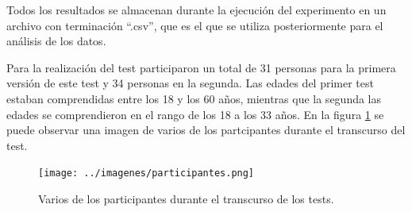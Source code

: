 \documentclass[11pt,a4paper,twoside]{book}
\begin{document}
                    Todos los resultados se almacenan durante la ejecución del experimento en un archivo con terminación ``.csv'', que es el que se utiliza posteriormente para el análisis de los datos.
                
                    Para la realización del test participaron un total de 31 personas para la primera versión de este test y 34 personas en la segunda. Las edades del primer test estaban comprendidas entre los 18 y los 60 años, mientras que la segunda las edades se comprendieron en el rango de los 18 a los 33 años. En la figura \ref{fig:participantes} se puede observar una imagen de varios de los partcipantes durante el transcurso del test.
                
                    \begin{figure}
                        \texttt{[image: ../imagenes/participantes.png]}
			            \centering
			            \caption{Varios de los participantes durante el transcurso de los tests.}
			            \label{fig:participantes}
                    \end{figure}
            
            


\end{document}
